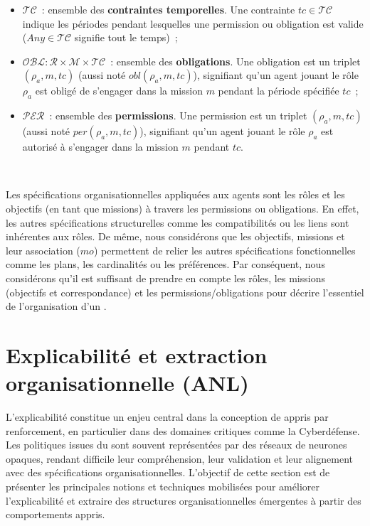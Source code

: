 \begin{itemize}
  \item $\mathcal{TC}$~: ensemble des \textbf{contraintes temporelles}. Une contrainte $tc \in \mathcal{TC}$ indique les périodes pendant lesquelles une permission ou obligation est valide ($Any \in \mathcal{TC}$ signifie tout le temps)~;
  \item $\mathcal{OBL}: \mathcal{R} \times \mathcal{M} \times \mathcal{TC}$~: ensemble des \textbf{obligations}. Une obligation est un triplet $(\rho_a, m, tc)$ (aussi noté $obl(\rho_a, m, tc)$), signifiant qu'un agent jouant le rôle $\rho_a$ est obligé de s'engager dans la mission $m$ pendant la période spécifiée $tc$~;
  \item $\mathcal{PER}$~: ensemble des \textbf{permissions}. Une permission est un triplet $(\rho_a, m, tc)$ (aussi noté $per(\rho_a, m, tc)$), signifiant qu'un agent jouant le rôle $\rho_a$ est autorisé à s'engager dans la mission $m$ pendant $tc$.
\end{itemize}

\

\noindent Les spécifications organisationnelles appliquées aux agents sont les rôles et les objectifs (en tant que missions) à travers les permissions ou obligations. En effet, les autres spécifications structurelles comme les compatibilités ou les liens sont inhérentes aux rôles. De même, nous considérons que les objectifs, missions et leur association ($mo$) permettent de relier les autres spécifications fonctionnelles comme les plans, les cardinalités ou les préférences.
Par conséquent, nous considérons qu'il est suffisant de prendre en compte les rôles, les missions (objectifs et correspondance) et les permissions/obligations pour décrire l'essentiel de l'organisation d'un .


\section{Explicabilité et extraction organisationnelle (ANL)}

\noindent
L'explicabilité constitue un enjeu central dans la conception de 
appris par renforcement, en particulier dans des domaines critiques comme la Cyberdéfense.
Les politiques issues du  sont souvent représentées par des réseaux de neurones
opaques, rendant difficile leur compréhension, leur validation et leur alignement
avec des spécifications organisationnelles.
L'objectif de cette section est de présenter les principales notions et techniques
mobilisées pour améliorer l'explicabilité et extraire des structures organisationnelles
émergentes à partir des comportements appris.

